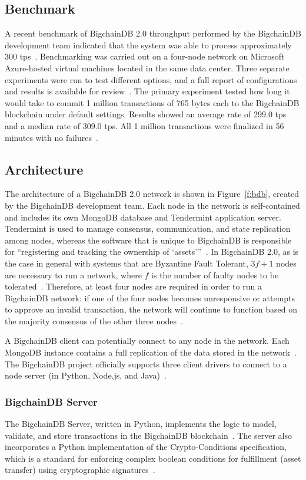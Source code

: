 \subsection{Benchmark}
A recent benchmark of BigchainDB 2.0 throughput performed by the
BigchainDB development team indicated that the system was able to process
approximately 300 tps~\cite{troyM18a, bdb18g}. Benchmarking was carried out on
a four-node network on Microsoft Azure-hosted virtual machines located in the
same data center. Three separate experiments were run to test different
options, and a full report of configurations and results is available for
review~\cite{bdb18g}. The primary experiment tested how long it would take to
commit 1 million transactions of 765 bytes each to the BigchainDB blockchain
under default settings. Results showed an average rate of 299.0 tps and a
median rate of 309.0 tps. All 1 million transactions were finalized in 56
minutes with no failures~\cite{bdb18g}.

\subsection{Architecture}
The architecture of a BigchainDB 2.0 network is shown in
Figure~\ref{f:bdb}, created by the BigchainDB development team. Each node
in the network is self-contained and includes its own MongoDB database and
Tendermint application server. Tendermint is used to manage consensus,
communication, and state replication among nodes, whereas the software that
is unique to BigchainDB is responsible for ``registering and tracking the
ownership of `assets'\thinspace''~\cite{troyM18b}. ﻿In BigchainDB 2.0, as is
the case in general with systems that are Byzantine Fault Tolerant, $3f + 1$
nodes are necessary to run a network, where $f$ is the number of faulty
nodes to be tolerated~\cite{bdb18}. Therefore, at least four nodes are
required in order to run a BigchainDB network: if one of the four nodes
becomes unresponsive or attempts to approve an invalid transaction, the
network will continue to function based on the majority consensus of the
other three nodes~\cite{bdb18}.

A BigchainDB client can potentially connect to any node in the network.
Each MongoDB instance contains a full replication of the data stored in the
network~\cite{bdb18}. The BigchainDB project officially supports three
client drivers to connect to a node server (in Python, Node.js, and
Java)~\cite{bdb18f}.

\subsubsection{BigchainDB Server}
The BigchainDB Server, written in Python, implements the logic to
model, validate, and store transactions in the BigchainDB
blockchain~\cite{troyM18b}. The server also incorporates a Python
implementation of the Crypto-Conditions specification, which is a standard
for enforcing complex boolean conditions for fulfillment (asset transfer)
using cryptographic signatures~\cite{cryptocon}.

